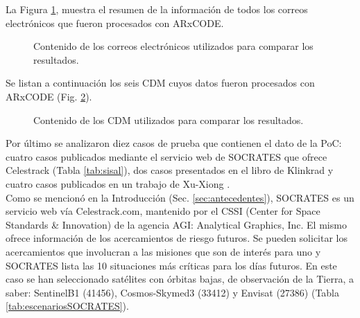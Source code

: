 La Figura \ref{fig:tablamails}, muestra el resumen de la informaci\'on de todos los correos electr\'onicos que fueron procesados con ARxCODE. \\

\begin{figure}[!h]
  \centering
  \caption{Contenido de los correos electr\'onicos utilizados para comparar los resultados.}
  \label{fig:tablamails}
\end{figure}

Se listan a continuaci\'on los seis CDM cuyos datos fueron procesados con ARxCODE (Fig. \ref{fig:cdmsproc}). 

 \begin{figure}[H]
  \centering
  \caption{Contenido de los CDM utilizados para comparar los resultados.}
  \label{fig:cdmsproc}
\end{figure}

Por \'ultimo se analizaron diez casos de prueba que contienen el dato de la PoC: cuatro casos publicados mediante el servicio web de SOCRATES \citep{Kelso} que ofrece Celestrack (Tabla \ref{tab:sisal}),  dos casos  presentados en el libro de Klinkrad \citep{KlinkradChapter8} y cuatro casos publicados en un trabajo de Xu-Xiong \citep{xu2014method}.\\

Como se mencion\'o en la Introducci\'on (Sec. \ref{sec:antecedentes}), SOCRATES es un 
servicio web v\'ia Celestrack.com, mantenido por el CSSI (Center for Space Standards \& Innovation) de la agencia AGI: Analytical Graphics, Inc. El mismo ofrece informaci\'on de los acercamientos de riesgo futuros. Se pueden solicitar los acercamientos que involucran a las misiones que son de inter\'es para uno y SOCRATES lista las 10 situaciones m\'as cr\'iticas para los d\'ias futuros. En este caso se han seleccionado sat\'elites con \'orbitas bajas, de observaci\'on de la Tierra, a saber: SentinelB1 (41456), Cosmos-Skymed3 (33412) y Envisat (27386) (Tabla \ref{tab:escenariosSOCRATES}).

